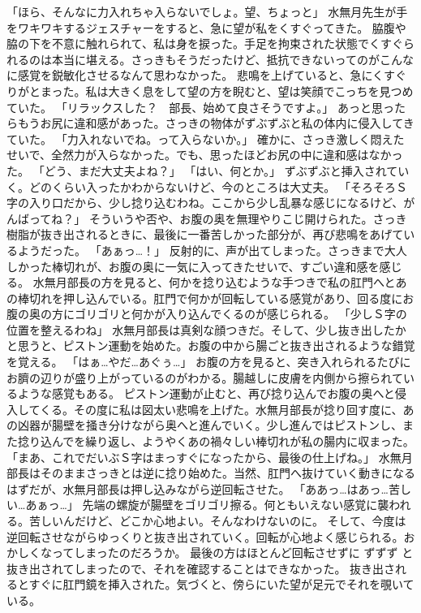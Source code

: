 「ほら、そんなに力入れちゃ入らないでしょ。望、ちょっと」
水無月先生が手をワキワキするジェスチャーをすると、急に望が私をくすぐってきた。
脇腹や脇の下を不意に触れられて、私は身を捩った。手足を拘束された状態でくすぐられるのは本当に堪える。さっきもそうだったけど、抵抗できないってのがこんなに感覚を鋭敏化させるなんて思わなかった。
悲鳴を上げていると、急にくすぐりがとまった。私は大きく息をして望の方を睨むと、望は笑顔でこっちを見つめていた。
「リラックスした？　部長、始めて良さそうですよ。」
あっと思ったらもうお尻に違和感があった。さっきの物体がずぶずぶと私の体内に侵入してきていた。
「力入れないでね。って入らないか。」
確かに、さっき激しく悶えたせいで、全然力が入らなかった。でも、思ったほどお尻の中に違和感はなかった。
「どう、まだ大丈夫よね？」
「はい、何とか。」
ずぶずぶと挿入されていく。どのくらい入ったかわからないけど、今のところは大丈夫。
「そろそろＳ字の入り口だから、少し捻り込むわね。ここから少し乱暴な感じになるけど、がんばってね？」
そういうや否や、お腹の奥を無理やりこじ開けられた。さっき樹脂が抜き出されるときに、最後に一番苦しかった部分が、再び悲鳴をあげているようだった。
「あぁっ…！」
反射的に、声が出てしまった。さっきまで大人しかった棒切れが、お腹の奥に一気に入ってきたせいで、すごい違和感を感じる。
水無月部長の方を見ると、何かを捻り込むような手つきで私の肛門へとあの棒切れを押し込んでいる。肛門で何かが回転している感覚があり、回る度にお腹の奥の方にゴリゴリと何かが入り込んでくるのが感じられる。
「少しＳ字の位置を整えるわね」
水無月部長は真剣な顔つきだ。そして、少し抜き出したかと思うと、ピストン運動を始めた。お腹の中から腸ごと抜き出されるような錯覚を覚える。
「はぁ…やだ…あぐぅ…」
お腹の方を見ると、突き入れられるたびにお臍の辺りが盛り上がっているのがわかる。腸越しに皮膚を内側から擦られているような感覚もある。
ピストン運動が止むと、再び捻り込んでお腹の奥へと侵入してくる。その度に私は図太い悲鳴を上げた。水無月部長が捻り回す度に、あの凶器が腸壁を掻き分けながら奥へと進んでいく。少し進んではピストンし、また捻り込んでを繰り返し、ようやくあの禍々しい棒切れが私の腸内に収まった。
「まあ、これでだいぶＳ字はまっすぐになったから、最後の仕上げね。」
水無月部長はそのままさっきとは逆に捻り始めた。当然、肛門へ抜けていく動きになるはずだが、水無月部長は押し込みながら逆回転させた。
「ああっ…はあっ…苦しい…あぁっ…」
先端の螺旋が腸壁をゴリゴリ擦る。何ともいえない感覚に襲われる。苦しいんだけど、どこか心地よい。そんなわけないのに。
そして、今度は逆回転させながらゆっくりと抜き出されていく。回転が心地よく感じられる。おかしくなってしまったのだろうか。
最後の方はほとんど回転させずに ずずず と抜き出されてしまったので、それを確認することはできなかった。
抜き出されるとすぐに肛門鏡を挿入された。気づくと、傍らにいた望が足元でそれを覗いている。
